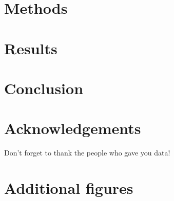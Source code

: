 \documentclass[twocolumn, 10pt, a4paper]{memoir}
\begin{document}
\chapter{Methods}



\chapter{Results}



\chapter{Conclusion}



\cleardoublepage
\chapter*{Acknowledgements}\vspace{-6mm}       %

Don't forget to thank the people who gave you data!



\renewcommand{\bibname}{Bibliography} 






\appendix
\chapter{Additional figures}


\end{document}
